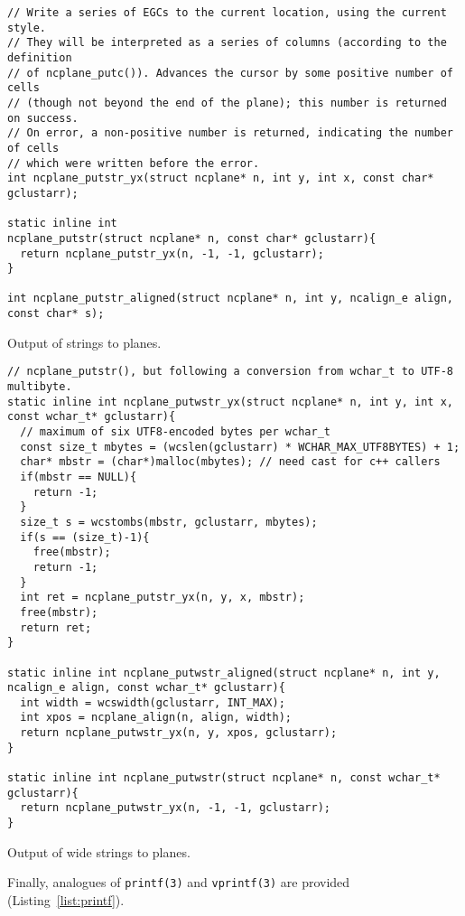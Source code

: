 \begin{listing}[!htb]
\begin{verbatim}
// Write a series of EGCs to the current location, using the current style.
// They will be interpreted as a series of columns (according to the definition
// of ncplane_putc()). Advances the cursor by some positive number of cells
// (though not beyond the end of the plane); this number is returned on success.
// On error, a non-positive number is returned, indicating the number of cells
// which were written before the error.
int ncplane_putstr_yx(struct ncplane* n, int y, int x, const char* gclustarr);

static inline int
ncplane_putstr(struct ncplane* n, const char* gclustarr){
  return ncplane_putstr_yx(n, -1, -1, gclustarr);
}

int ncplane_putstr_aligned(struct ncplane* n, int y, ncalign_e align, const char* s);
\end{verbatim}
\caption{Output of strings to planes.}
\label{list:putstr}
\end{listing}

\begin{listing}[!htb]
\begin{verbatim}
// ncplane_putstr(), but following a conversion from wchar_t to UTF-8 multibyte.
static inline int ncplane_putwstr_yx(struct ncplane* n, int y, int x, const wchar_t* gclustarr){
  // maximum of six UTF8-encoded bytes per wchar_t
  const size_t mbytes = (wcslen(gclustarr) * WCHAR_MAX_UTF8BYTES) + 1;
  char* mbstr = (char*)malloc(mbytes); // need cast for c++ callers
  if(mbstr == NULL){
    return -1;
  }
  size_t s = wcstombs(mbstr, gclustarr, mbytes);
  if(s == (size_t)-1){
    free(mbstr);
    return -1;
  }
  int ret = ncplane_putstr_yx(n, y, x, mbstr);
  free(mbstr);
  return ret;
}

static inline int ncplane_putwstr_aligned(struct ncplane* n, int y, ncalign_e align, const wchar_t* gclustarr){
  int width = wcswidth(gclustarr, INT_MAX);
  int xpos = ncplane_align(n, align, width);
  return ncplane_putwstr_yx(n, y, xpos, gclustarr);
}

static inline int ncplane_putwstr(struct ncplane* n, const wchar_t* gclustarr){
  return ncplane_putwstr_yx(n, -1, -1, gclustarr);
}
\end{verbatim}
\caption{Output of wide strings to planes.}
\label{list:wputstr}
\end{listing}

Finally, analogues of \texttt{printf(3)} and \texttt{vprintf(3)} are provided (Listing~\ref{list:printf}).

